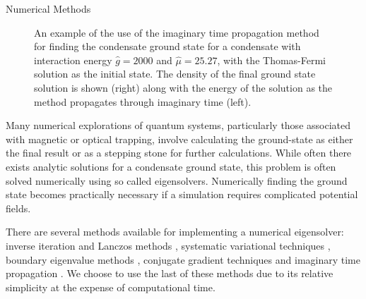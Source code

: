\begin{chapter}{\label{cha:numerics}Numerical Methods}
\begin{figure}
	\caption{An example of the use of the imaginary time propagation method for finding the condensate ground state for a condensate with interaction energy $\hat{g}=2000$ and $\hat{\mu}=25.27$, with the Thomas-Fermi solution as the initial state. The density of the final ground state solution is shown (right) along with the energy of the solution as the method propagates through imaginary time (left).}\label{fig_imagtimesolgs}
\end{figure}
	Many numerical explorations of quantum systems, particularly those associated with magnetic or optical trapping,  involve calculating the ground-state as either the final result or as a stepping stone for further calculations. While often there exists analytic solutions for a condensate ground state, this problem is often solved numerically using so called eigensolvers. Numerically finding the ground state becomes practically necessary if a simulation requires complicated potential fields.

	There are several methods available for implementing a numerical eigensolver: inverse iteration and Lanczos methods \cite{thijssen1999computational}, systematic variational techniques \cite{Bao2003230}, boundary eigenvalue methods \cite{Edwards95}, conjugate gradient techniques \cite{NumericalRecipes} and imaginary time propagation \cite{PhysRevE.62.7438}. We choose to use the last of these methods due to its relative simplicity at the expense of computational time.


\end{chapter}
